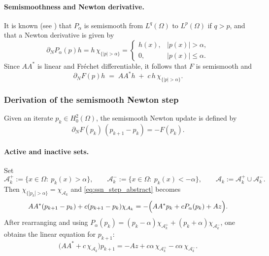 \documentclass[11pt,a4paper]{article}
\begin{document}
\paragraph{Semismoothness and Newton derivative.}
It is known (see \cite[Ex.~8.14]{ItoKunisch2008}) that $P_\alpha$ is semismooth from $L^q(\Omega)$ to $L^p(\Omega)$ if $q>p$,
and that a Newton derivative is given by
\begin{equation}\label{eq:Newton_derivative_Palpha}
\partial_N P_\alpha(p)h = h\,\chi_{\{|p|>\alpha\}}
=
\begin{cases}
h(x), & |p(x)|>\alpha,\\
0, & |p(x)|\le \alpha.
\end{cases}
\end{equation}
Since $AA^\ast$ is linear and Fr\'echet differentiable, it follows that $F$ is semismooth and
\begin{equation}\label{eq:Newton_derivative_F}
\partial_N F(p)h \;=\; AA^\ast h \;+\; c\,h\,\chi_{\{|p|>\alpha\}}.
\end{equation}

\subsubsection{Derivation of the semismooth Newton step}

Given an iterate $p_k\in H_0^2(\Omega)$, the semismooth Newton update is defined by
\begin{equation}\label{eq:ssn_step_abstract}
\partial_N F(p_k)\,(p_{k+1}-p_k) = -F(p_k).
\end{equation}

\paragraph{Active and inactive sets.}
Set
\begin{equation}\label{eq:active_sets_paper}
\mathcal{A}_k^+ := \{x\in\Omega:\ p_k(x)>\alpha\},\qquad
\mathcal{A}_k^- := \{x\in\Omega:\ p_k(x)<-\alpha\},\qquad
\mathcal{A}_k := \mathcal{A}_k^+\cup \mathcal{A}_k^-.
\end{equation}
Then $\chi_{\{|p_k|>\alpha\}}=\chi_{\mathcal{A}_k}$ and \eqref{eq:ssn_step_abstract} becomes
\[
AA^\ast(p_{k+1}-p_k)+c(p_{k+1}-p_k)\chi_{\mathcal{A}_k} = -\Bigl(AA^\ast p_k + cP_\alpha(p_k)+Az\Bigr).
\]
After rearranging and using $P_\alpha(p_k)=(p_k-\alpha)\chi_{\mathcal{A}_k^+}+(p_k+\alpha)\chi_{\mathcal{A}_k^-}$,
one obtains the linear equation for $p_{k+1}$:
\begin{equation}\label{eq:ssn_step_strong}
\bigl(AA^\ast + c\,\chi_{\mathcal{A}_k}\bigr)p_{k+1}
=
-Az + c\alpha\,\chi_{\mathcal{A}_k^+} - c\alpha\,\chi_{\mathcal{A}_k^-}.
\end{equation}
\end{document}
